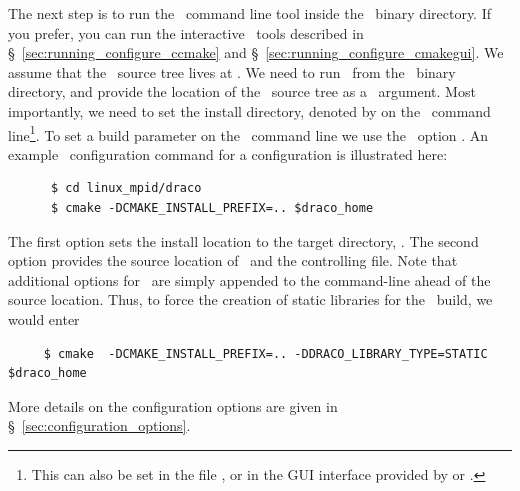 The next step is to run the \cmake\ command line tool inside the \draco\ binary directory.  If you prefer, you can run the interactive \cmake\ tools described in \S~\ref{sec:running_configure_ccmake} and \S~\ref{sec:running_configure_cmakegui}.  We assume that the \draco\ source tree lives at \dracohome.  We need to
run \cmake\ from the \draco\ binary directory,  and provide the location of the \draco\ source tree as a \cmake\ argument.  Most importantly, we need to set the
install directory, denoted by  on the \cmake\ command line\footnote{This can also be set in the file , or in the GUI interface provided by  or .}.  To set a build parameter on the \cmake\ command line we use the \cmake\ option .  An example \cmake\ configuration command for a   configuration is illustrated here:
\begin{verbatim}
      $ cd linux_mpid/draco
      $ cmake -DCMAKE_INSTALL_PREFIX=.. $draco_home
\end{verbatim}
The first option sets the install location to the target directory, .  The second option provides the source location of \draco\ and the controlling  file.
Note that additional options for \cmake\ are simply
appended to the command-line ahead of the source location.  Thus, to force the creation of static libraries for the \draco\ build,
we would enter
\begin{verbatim}
     $ cmake  -DCMAKE_INSTALL_PREFIX=.. -DDRACO_LIBRARY_TYPE=STATIC $draco_home
\end{verbatim}
More details on the configuration options are given in
\S~\ref{sec:configuration_options}.

